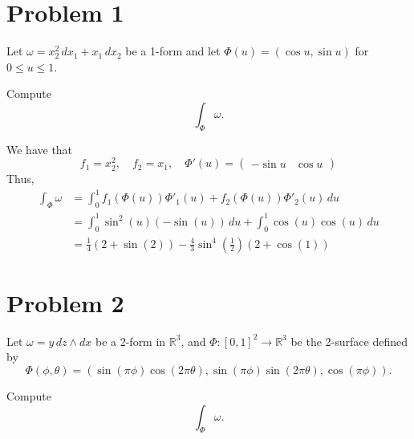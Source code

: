 \documentclass[11pt]{article}
\begin{document}
	
	
	\psetheader


\section*{Problem 1}
Let \(\omega = x_2^2\,dx_1 + x_1\,dx_2\) be a 1-form and let \(\Phi(u) = (\cos u, \sin u)\) for \(0 \leq u \leq 1\).

Compute
\[
\int_{\Phi} \omega.
\]

\begin{solution}
We have that 
\[f_1 = x_2^2, \quad f_2= x_1, \quad \Phi'(u) = \begin{pmatrix}
        -\sin u & \cos u
    \end{pmatrix}\]
    Thus, 
    \begin{align*}
        \int_\Phi \omega &= \int_0^1 f_1(\Phi(u))\Phi'_1(u) + f_2(\Phi(u))\Phi'_2(u)\, du\\
        &=\int_0^1 \sin^2(u)(-\sin (u))\, du + \int_0^1\cos (u) \cos(u)\, du\\
        &= \frac{1}{4} (2 + \sin(2)) - \frac{4}{3} \sin^4\left(\frac{1}{2}\right)(2 + \cos(1)) 
    \end{align*}


\end{solution}

\newpage
\section*{Problem 2}
Let \(\omega = y\,dz \wedge dx\) be a 2-form in \(\mathbb{R}^3\), and \(\Phi : [0, 1]^2 \to \mathbb{R}^3\) be the 2-surface defined by
\[
\Phi(\phi, \theta) = (\sin(\pi\phi) \cos(2\pi\theta), \sin(\pi\phi) \sin(2\pi\theta), \cos(\pi\phi)).
\]

Compute
\[
\int_{\Phi} \omega.
\]
\end{document}
